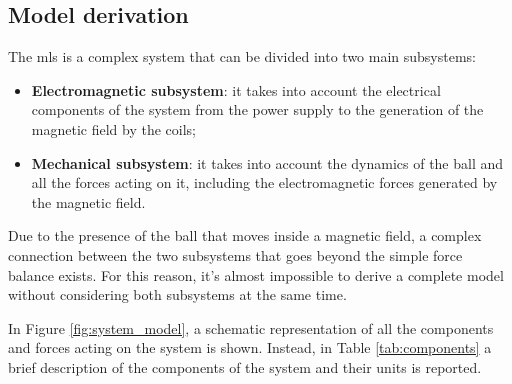 \subsection{Model derivation}
\label{subsec:model_derivation}

The \acrshort{mls} is a complex system that can be divided into two main subsystems:

\begin{itemize}
    \item \textbf{Electromagnetic subsystem}: it takes into account the electrical components of the system from the power supply to the generation of the magnetic field by the coils;
    \item \textbf{Mechanical subsystem}: it takes into account the dynamics of the ball and all the forces acting on it, including the electromagnetic forces generated by the magnetic field.
\end{itemize}

Due to the presence of the ball that moves inside a magnetic field, a complex connection between the two subsystems that goes beyond the simple force balance exists.
For this reason, it's almost impossible to derive a complete model without considering both subsystems at the same time.

In Figure \ref{fig:system_model}, a schematic representation of all the components and forces acting on the system is shown.
Instead, in Table \ref{tab:components} a brief description of the components of the system and their units is reported.

